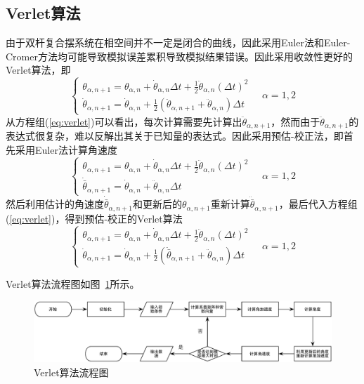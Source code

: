 \documentclass[a4paper,12pt,titlepage]{article}
\begin{document}
\subsection{Verlet算法}
由于双杆复合摆系统在相空间并不一定是闭合的曲线，因此采用Euler法和Euler-Cromer方法均可能导致模拟误差累积导致模拟结果错误。因此采用收敛性更好的Verlet算法，即
\begin{equation}
\label{eq:verlet}
	\begin{cases}
		\theta_{\alpha,n+1}=\theta_{\alpha,n}+\dot{\theta}_{\alpha,n}\Delta t+\frac{1}{2}\ddot{\theta}_{\alpha,n}(\Delta t)^2\\
		\dot{\theta}_{\alpha,n+1}=\dot{\theta}_{\alpha,n}+\frac{1}{2}(\ddot{\theta}_{\alpha,n+1}+\ddot{\theta}_{\alpha,n})\Delta t
	\end{cases}
	\quad \alpha = 1,2
\end{equation}
从方程组(\ref{eq:verlet})可以看出，每次计算需要先计算出$\ddot{\theta}_{\alpha,n+1}$，然而由于$\ddot{\theta}_{\alpha,n+1}$的表达式很复杂，难以反解出其关于已知量的表达式。因此采用预估-校正法，即首先采用Euler法计算角速度
\begin{equation}
	\begin{cases}
		\theta_{\alpha,n+1}=\theta_{\alpha,n}+\dot{\theta}_{\alpha,n}\Delta t+\frac{1}{2}\ddot{\theta}_{\alpha,n}(\Delta t)^2\\
		\dot{\bar{\theta}}_{\alpha,n+1}=\dot{\theta}_{\alpha,n}+\ddot{\theta}_{\alpha,n}\Delta t
	\end{cases}
	\quad \alpha = 1,2
\end{equation}
然后利用估计的角速度$\dot{\bar{\theta}}_{\alpha,n+1}$和更新后的$\theta_{\alpha,n+1}$重新计算$\ddot{\bar{\theta}}_{\alpha,n+1}$，最后代入方程组(\ref{eq:verlet})，得到预估-校正的Verlet算法
\begin{equation}
\label{eq:verlet2}
	\begin{cases}
		\theta_{\alpha,n+1}=\theta_{\alpha,n}+\dot{\theta}_{\alpha,n}\Delta t+\frac{1}{2}\ddot{\theta}_{\alpha,n}(\Delta t)^2\\
		\dot{\theta}_{\alpha,n+1}=\dot{\theta}_{\alpha,n}+\frac{1}{2}(\ddot{\bar{\theta}}_{\alpha,n+1}+\ddot{\theta}_{\alpha,n})\Delta t
	\end{cases}
	\quad \alpha = 1,2
\end{equation}

Verlet算法流程图如图~\ref{fig:process_Verlet}所示。
\begin{figure}[H]
\centering
\includegraphics[height=0.13\textheight]{./process.pdf}
\caption[Caption for LOF]{Verlet算法流程图}
\label{fig:process_Verlet}
\end{figure}
\end{document}
